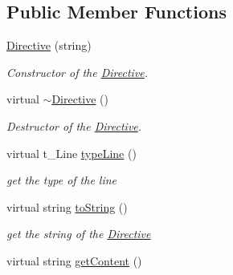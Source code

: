\subsection*{Public Member Functions}
\begin{DoxyCompactItemize}
\item 
\hypertarget{classDirective_a7487120f679e1b4d01843ad6feac7e07}{
\hyperlink{classDirective_a7487120f679e1b4d01843ad6feac7e07}{Directive} (string)}
\label{classDirective_a7487120f679e1b4d01843ad6feac7e07}

\begin{DoxyCompactList}\small\item\em Constructor of the \hyperlink{classDirective}{Directive}. \item\end{DoxyCompactList}\item 
\hypertarget{classDirective_aa9a48f09b0472c835ffa366bcff74f51}{
virtual \hyperlink{classDirective_aa9a48f09b0472c835ffa366bcff74f51}{$\sim$Directive} ()}
\label{classDirective_aa9a48f09b0472c835ffa366bcff74f51}

\begin{DoxyCompactList}\small\item\em Destructor of the \hyperlink{classDirective}{Directive}. \item\end{DoxyCompactList}\item 
\hypertarget{classDirective_a900c72c92ff32e7a673030a07dae3176}{
virtual t\_\-Line \hyperlink{classDirective_a900c72c92ff32e7a673030a07dae3176}{typeLine} ()}
\label{classDirective_a900c72c92ff32e7a673030a07dae3176}

\begin{DoxyCompactList}\small\item\em get the type of the line \item\end{DoxyCompactList}\item 
\hypertarget{classDirective_a6eeb8fca1505c28a3f54864edb24457c}{
virtual string \hyperlink{classDirective_a6eeb8fca1505c28a3f54864edb24457c}{toString} ()}
\label{classDirective_a6eeb8fca1505c28a3f54864edb24457c}

\begin{DoxyCompactList}\small\item\em get the string of the \hyperlink{classDirective}{Directive} \item\end{DoxyCompactList}\item 
\hypertarget{classDirective_a13fa431d4e5957049311f8df5f50b383}{
virtual string \hyperlink{classDirective_a13fa431d4e5957049311f8df5f50b383}{getContent} ()}
\label{classDirective_a13fa431d4e5957049311f8df5f50b383}


\end{DoxyCompactItemize}
